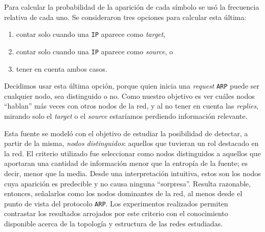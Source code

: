 \begin{enumerate}
    Para calcular la probabilidad de la aparición de cada símbolo se usó la
    frecuencia relativa de cada uno. Se consideraron tres opciones para
    calcular esta última:
    \begin{enumerate}
        \item contar solo cuando una \texttt{IP} aparece como \emph{target},
        \item contar solo cuando una \texttt{IP} aparece como \emph{source}, o
        \item tener en cuenta ambos casos.
    \end{enumerate}
    Decidimos usar esta última opción, porque quien inicia una \emph{request}
    \texttt{ARP} puede ser cualquier nodo, sea distinguido o no. Como nuestro objetivo
    es ver cuáles nodos ``hablan'' más veces con otros nodos de la red, y al
    no tener en cuenta las \emph{replies}, mirando solo el \emph{target} o el
    \emph{source} estaríamos perdiendo información relevante.

    Esta fuente se modeló con el objetivo de estudiar la posibilidad de
    detectar, a partir de la misma, \emph{nodos distinguidos}: aquellos que
    tuvieran un rol destacado en la red. El criterio utilizado fue seleccionar
    como nodos distinguidos a aquellos que aportaran una cantidad de
    información menor que la entropía de la fuente; es decir, menor que la
    media. Desde una interpretación intuitiva, estos son los nodos cuya
    aparición es predecible y no causa ninguna ``sorpresa''. Resulta
    razonable, entonces, señalarlos como los nodos dominantes de la red, al
    menos desde el punto de vista del protocolo \texttt{ARP}. Los experimentos
    realizados permiten contrastar los resultados arrojados por este criterio
    con el conocimiento disponible acerca de la topología y estructura de las
    redes estudiadas.

\end{enumerate}
